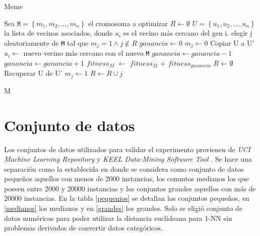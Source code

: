 \begin{algorithm}
\caption{Meme}
\label{meme}
\begin{algorithmic}[1]


\State Sea $\texttt{M} = \left\{ m_1,m_2,\dots,m_n \right\}$ el cromosoma a optimizar 
\State $R \gets \emptyset$
\State $ U = \left\{ u_1,u_2,\dots,u_n \right\}$ la lista de vecinos asociados, donde $u_i$ es el vecino más cercano del gen i. 
	\State elegir j aleatoriamente de \texttt{M} tal que $m_j=1 \land j \notin R$
	\State $ganancia \gets 0$
	\State $m_j \gets 0$
	\State Copiar U a U'
		\State $u_i \gets$ nuevo vecino más cercano con el nuevo \texttt{M}
			\State $ganancia \gets ganancia - 1$
			\State $ganancia \gets ganancia + 1$
		\EndIf
	\EndFor
		\State \emph{$fitness_M$} $\gets$ \emph{$fitness_M$} + \emph{$fitness_{ganancia}$}
		\State $R \gets \emptyset$
	\Else
		\State Recuperar U de U'
		\State $m_j \gets 1$
		\State $ R \gets R \cup j$
	\EndIf
\EndWhile

\State \Return M

\end{algorithmic}
\end{algorithm}


\section{Conjunto de datos}

Los conjuntos de datos utilizados para validar el experimento provienen de \emph{UCI Machine Learning Repository} \cite{Dua:2017} y \emph{KEEL Data-Mining Software Tool} \cite{alcala2011keel}. Se hace una separación como la establecida en \cite{de2004reduccion} donde se considera como conjunto de datos pequeños aquellos con menos de 2000 instancias, los conuntos medianos los que poseen entre 2000 y 20000 instancias y los conjuntos grandes aquellos con más de 20000 instancias. En la tabla \ref{pequenios} se detallan los conjuntos pequeños, en \ref{medianos} los medianos y en \ref{grandes} los grandes. Solo se eligió conjunto de datos numéricos para poder utilizar la distancia euclideana para 1-NN sin problemas derivados de convertir datos categóricos.

